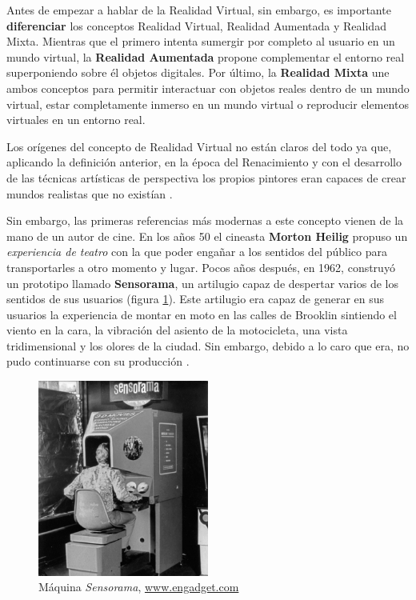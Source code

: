 Antes de empezar a hablar de la Realidad Virtual, sin embargo, es importante \textbf{diferenciar} los conceptos Realidad Virtual, Realidad Aumentada y Realidad Mixta. Mientras que el primero intenta sumergir por completo al usuario en un mundo virtual, la \textbf{Realidad Aumentada} propone complementar el entorno real superponiendo sobre él objetos digitales. Por último, la \textbf{Realidad Mixta}  une ambos conceptos para permitir interactuar con objetos reales dentro de un mundo virtual, estar completamente inmerso en un mundo virtual o reproducir elementos virtuales en un entorno real.

Los orígenes del concepto de Realidad Virtual no están claros del todo ya que, aplicando la definición anterior, en la época del Renacimiento y con el desarrollo de las técnicas artísticas de perspectiva los propios pintores eran capaces de crear mundos realistas que no existían \cite{schn-17}. 

Sin embargo, las primeras referencias más modernas a este concepto vienen de la mano de un autor de cine. En los años 50 el cineasta \textbf{Morton Heilig} propuso un \textit{experiencia de teatro} con la que poder engañar a los sentidos del  público para transportarles a otro momento y lugar. Pocos años después, en 1962, construyó un prototipo llamado \textbf{Sensorama}, un artilugio capaz de despertar varios de los sentidos de sus usuarios (figura \ref{fig:sensorama}). Este artilugio era capaz de generar en sus usuarios la experiencia de montar en moto en las calles de Brooklin sintiendo el viento en la cara, la vibración del asiento de la motocicleta, una vista tridimensional y los olores de la ciudad. Sin embargo, debido a lo caro que era, no pudo continuarse con su producción \cite{brock-16}.

\vspace{0.2cm}

\begin{figure}[!h]
    \begin{center}
        \includegraphics[width=0.5\textwidth]{imagenes/2/sensorama.jpg}
        \caption{Máquina \textit{Sensorama}, \url{www.engadget.com}}
        \label{fig:sensorama}
    \end{center}
\end{figure}

